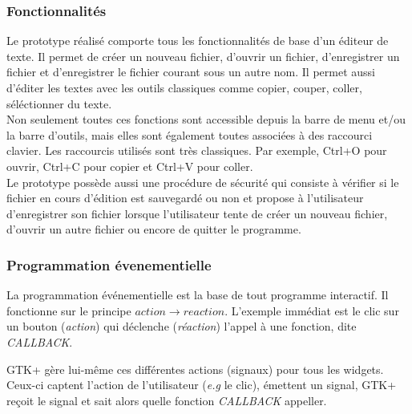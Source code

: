 \subsubsection*{Fonctionnalités}
Le prototype réalisé comporte tous les fonctionnalités de base d'un
éditeur de texte. Il permet de créer un nouveau fichier, d'ouvrir un
fichier, d'enregistrer un fichier et d'enregistrer le fichier courant
sous un autre nom. Il permet aussi d'éditer les textes avec les outils
classiques comme copier, couper, coller, séléctionner du texte.
\\ Non seulement toutes ces fonctions sont accessible depuis la barre
de menu et/ou la barre d'outils, mais elles sont également toutes associées
à des raccourci clavier. Les raccourcis utilisés sont très
classiques. Par exemple, Ctrl+O pour ouvrir, Ctrl+C pour copier et
Ctrl+V pour coller.
\\ Le prototype possède aussi une procédure de
sécurité qui consiste à vérifier si le fichier en cours d'édition est
sauvegardé ou non et propose à l'utilisateur d'enregistrer son
fichier lorsque l'utilisateur tente de créer un nouveau fichier,
d'ouvrir un autre fichier ou encore de quitter le programme.


\subsubsection{Programmation évenementielle}

La programmation événementielle est la base de tout programme interactif.
Il fonctionne sur le principe $action \rightarrow reaction$. L'exemple 
immédiat est le clic sur un bouton (\textit{action}) qui déclenche (\textit{réaction}) 
l'appel à une fonction, dite \textit{CALLBACK}.

GTK+ gère lui-même ces différentes actions (signaux) pour tous les widgets.
Ceux-ci captent l'action de l'utilisateur (\textit{e.g} le clic), émettent 
un signal, GTK+ reçoit le signal et sait alors quelle fonction \textit{CALLBACK} 
appeller.

